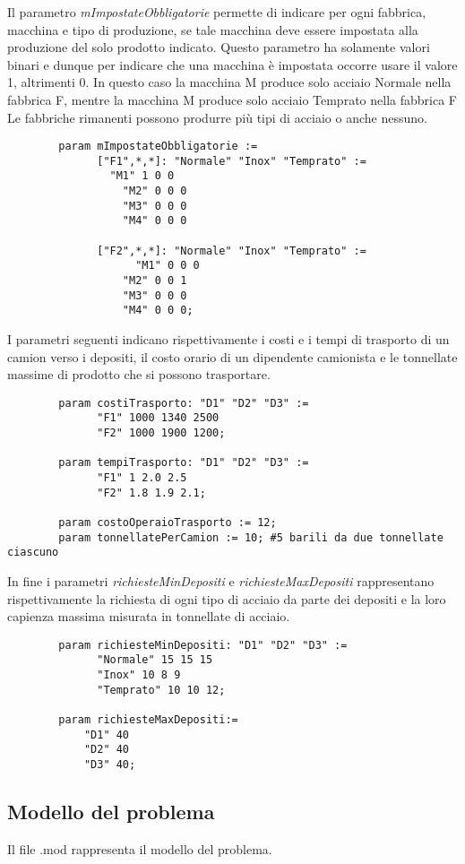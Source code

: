 \documentclass[12pt]{article} %
\begin{document}
		Il parametro \textit{mImpostateObbligatorie} permette di indicare per ogni fabbrica, macchina e tipo di produzione, se tale macchina deve essere impostata alla produzione del solo prodotto indicato.
		Questo parametro ha solamente valori binari e dunque per indicare che una macchina è impostata occorre usare il valore 1, altrimenti 0.
		In questo caso la macchina M produce solo acciaio Normale nella fabbrica F, mentre la macchina M produce solo acciaio Temprato nella fabbrica F
		Le fabbriche rimanenti possono produrre più tipi di acciaio o anche nessuno.
		\begin{lstlisting}
		param mImpostateObbligatorie :=
		      ["F1",*,*]: "Normale" "Inox" "Temprato" :=
		      	"M1" 1 0 0
			      "M2" 0 0 0 
			      "M3" 0 0 0 
			      "M4" 0 0 0 

		      ["F2",*,*]: "Normale" "Inox" "Temprato" :=
		            "M1" 0 0 0
			      "M2" 0 0 1 
			      "M3" 0 0 0 
			      "M4" 0 0 0; 
		\end{lstlisting}

		I parametri seguenti indicano rispettivamente i costi e i tempi di trasporto di un camion verso i depositi, il costo orario di un dipendente camionista e le tonnellate massime di prodotto che si possono trasportare.
		\begin{lstlisting}
		param costiTrasporto: "D1" "D2" "D3" := 
		      "F1" 1000 1340 2500
		      "F2" 1000 1900 1200;

		param tempiTrasporto: "D1" "D2" "D3" := 
		      "F1" 1 2.0 2.5
		      "F2" 1.8 1.9 2.1;

		param costoOperaioTrasporto := 12;
		param tonnellatePerCamion := 10; #5 barili da due tonnellate ciascuno
		\end{lstlisting}

		In fine i parametri \textit{richiesteMinDepositi} e \textit{richiesteMaxDepositi} rappresentano rispettivamente la richiesta di ogni tipo di acciaio da parte dei depositi e la loro capienza massima misurata in tonnellate di acciaio.
		\begin{lstlisting}
		param richiesteMinDepositi: "D1" "D2" "D3" :=
		      "Normale" 15 15 15
		      "Inox" 10 8 9
		      "Temprato" 10 10 12;

		param richiesteMaxDepositi:=
			"D1" 40
			"D2" 40
			"D3" 40;
		\end{lstlisting}



\newpage
	\subsection{Modello del problema}
	Il file .mod rappresenta il modello del problema.
\end{document}
